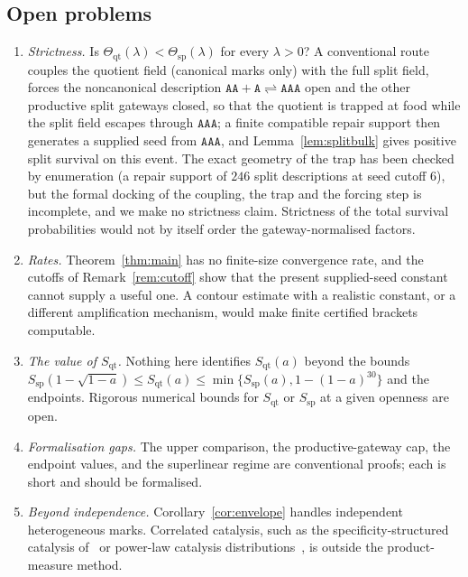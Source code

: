 \documentclass[11pt,a4paper]{article}
\theoremstyle{plain}
\theoremstyle{definition}
\theoremstyle{remark}
\newcommand{\qt}{\mathrm{qt}}
\newcommand{\spc}{\mathrm{sp}}
\newcommand{\word}[1]{\mathtt{#1}}
\begin{document}
\subsection*{Open problems}
\begin{enumerate}[label=\textup{(\arabic*)}]
\item \emph{Strictness.} Is $\Theta_{\qt}(\lambda)<\Theta_{\spc}(\lambda)$ for every $\lambda>0$? A conventional route couples the quotient field (canonical marks only) with the full split field, forces the noncanonical description $\word{AA}+\word A\rightleftharpoons\word{AAA}$ open and the other productive split gateways closed, so that the quotient is trapped at food while the split field escapes through $\word{AAA}$; a finite compatible repair support then generates a supplied seed from $\word{AAA}$, and Lemma~\ref{lem:splitbulk} gives positive split survival on this event. The exact geometry of the trap has been checked by enumeration (a repair support of $246$ split descriptions at seed cutoff $6$), but the formal docking of the coupling, the trap and the forcing step is incomplete, and we make no strictness claim. Strictness of the total survival probabilities would not by itself order the gateway-normalised factors.
\item \emph{Rates.} Theorem~\ref{thm:main} has no finite-size convergence rate, and the cutoffs of Remark~\ref{rem:cutoff} show that the present supplied-seed constant cannot supply a useful one. A contour estimate with a realistic constant, or a different amplification mechanism, would make finite certified brackets computable.
\item \emph{The value of $S_{\qt}$.} Nothing here identifies $S_{\qt}(a)$ beyond the bounds $S_{\spc}(1-\sqrt{1-a})\le S_{\qt}(a)\le\min\{S_{\spc}(a),1-(1-a)^{30}\}$ and the endpoints. Rigorous numerical bounds for $S_{\qt}$ or $S_{\spc}$ at a given openness are open.
\item \emph{Formalisation gaps.} The upper comparison, the productive-gateway cap, the endpoint values, and the superlinear regime are conventional proofs; each is short and should be formalised.
\item \emph{Beyond independence.} Corollary~\ref{cor:envelope} handles independent heterogeneous marks. Correlated catalysis, such as the specificity-structured catalysis of~\cite{hordijk2014specificity} or power-law catalysis distributions~\cite{hordijk2016variable}, is outside the product-measure method.
\end{enumerate}
\end{document}
